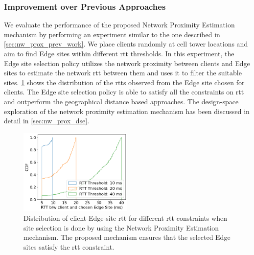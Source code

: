 \subsubsection{Improvement over Previous Approaches}
We evaluate the performance of the proposed Network Proximity Estimation mechanism by performing an experiment similar to the one described in \cref{sec:nw_prox_prev_work}. We place clients randomly at cell tower locations and aim to find Edge sites within different \gls{rtt} thresholds. In this experiment, the Edge site selection policy utilizes the network proximity between clients and Edge sites to estimate the network \gls{rtt} between them and uses it to filter the suitable sites. \cref{fig:nw_prox_summary_result} shows the distribution of the \glspl{rtt} observed from the Edge site chosen for clients. The Edge site selection policy is able to satisfy all the constraints on \gls{rtt} and outperform the geographical distance based approaches. The design-space exploration of the network proximity estimation mechanism has been discussed in detail in \cref{sec:nw_prox_dse}.
\begin{figure}
\centering
\includegraphics[width=0.5\textwidth]{figures/mechanisms/nw_proximity/nc_rtt_threshold.png}
\caption{Distribution of client-Edge-site \gls{rtt} for different \gls{rtt} constraints when site selection is done by using the Network Proximity Estimation mechanism. The proposed mechanism ensures that the selected Edge sites satisfy the \gls{rtt} constraint.}
\label{fig:nw_prox_summary_result}
\end{figure}

